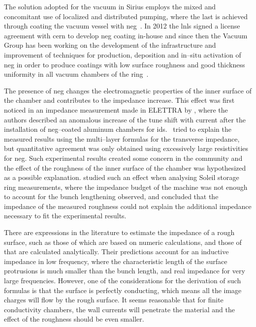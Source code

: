     The solution adopted for the vacuum in Sirius employs the mixed and concomitant use of localized and distributed pumping, where the last is achieved through coating the vacuum vessel with \gls{neg}~\cite{Benvenuti1998,Prodromides2002}. In 2012 the \gls{lnls} signed a license agreement with \gls{cern} to develop \gls{neg} coating in-house and since then the Vacuum Group has been working on the development of the infrastructure and improvement of techniques for production, deposition and in--situ activation of \gls{neg} in order to produce coatings with low surface roughness and good thickness uniformity in all vacuum chambers of the ring~\cite{Seraphim2015,Rocha2017}.

    The presence of \gls{neg} changes the electromagnetic properties of the inner surface of the chamber and contributes to the impedance increase. This effect was first noticed in an impedance measurement made in ELETTRA by , where the authors described an anomalous increase of the tune shift with current after the installation of \gls{neg}--coated aluminum chambers for \glspl{id}.~ tried to explain the measured results using the multi--layer formulas for the transverse impedance, but quantitative agreement was only obtained using excessively large resistivities for \gls{neg}. Such experimental results created some concern in the community and the effect of the roughness of the inner surface of the chamber was hypothesized as a possible explanation.  studied such an effect when analysing Soleil storage ring measurements, where the impedance budget of the machine was not enough to account for the bunch lengthening observed, and concluded that the impedance of the measured roughness could not explain the additional impedance necessary to fit the experimental results.

    There are expressions in the literature to estimate the impedance of a rough surface, such as those of  which are based on numeric calculations, and those of  that are calculated analytically. Their predictions account for an inductive impedance in low frequency, where the characteristic length of the surface protrusions is much smaller than the bunch length, and real impedance for very large frequencies. However, one of the considerations for the derivation of such formulas is that the surface is perfectly conducting, which means all the image charges will flow by the rough surface. It seems reasonable that for finite conductivity chambers, the wall currents will penetrate the material and the effect of the roughness should be even smaller.

